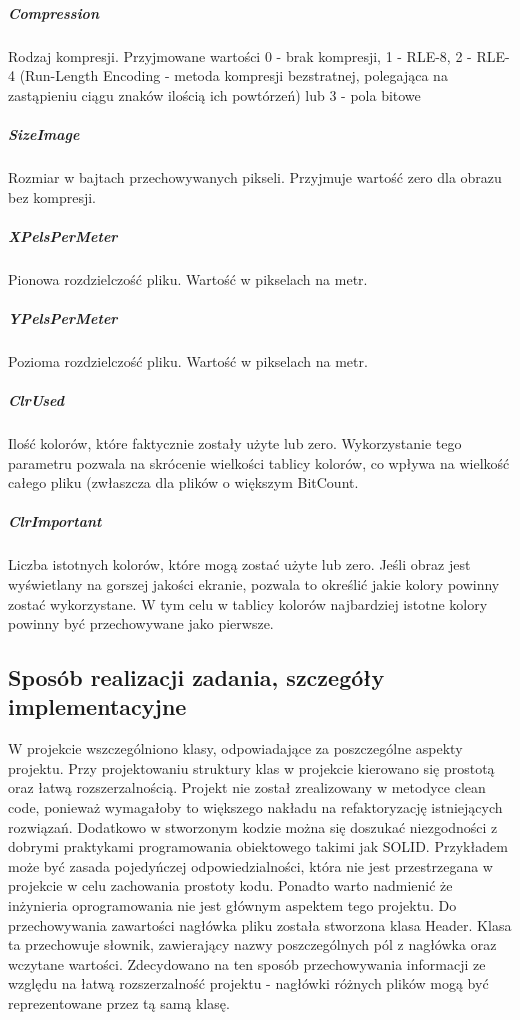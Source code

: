 \documentclass{article}
\begin{document}
\subparagraph{Compression}
Rodzaj kompresji. Przyjmowane wartości 0 - brak kompresji, 1 - RLE-8, 2 - RLE-4 (Run-Length Encoding - metoda kompresji bezstratnej, polegająca na zastąpieniu ciągu znaków ilością ich powtórzeń) lub 3 - pola bitowe

\subparagraph{SizeImage}
Rozmiar w bajtach przechowywanych pikseli. Przyjmuje wartość zero dla obrazu bez kompresji.

\subparagraph{XPelsPerMeter}
Pionowa rozdzielczość pliku. Wartość w pikselach na metr.

\subparagraph{YPelsPerMeter}
Pozioma rozdzielczość pliku. Wartość w pikselach na metr.

\subparagraph{ClrUsed}
Ilość kolorów, które faktycznie zostały użyte lub zero. Wykorzystanie tego parametru pozwala na skrócenie wielkości tablicy kolorów, co wpływa na wielkość całego pliku (zwłaszcza dla plików o większym BitCount.

\subparagraph{ClrImportant}
Liczba istotnych kolorów, które mogą zostać użyte lub zero. Jeśli obraz jest wyświetlany na gorszej jakości ekranie, pozwala to określić jakie kolory powinny zostać wykorzystane. W tym celu w tablicy kolorów najbardziej istotne kolory powinny być przechowywane jako pierwsze.



\subsection{Sposób realizacji zadania, szczegóły implementacyjne}
W projekcie wszczególniono klasy, odpowiadające za poszczególne aspekty projektu. Przy projektowaniu struktury klas w projekcie kierowano się prostotą oraz łatwą rozszerzalnością. Projekt nie został zrealizowany w metodyce clean code, ponieważ wymagałoby to większego nakładu na refaktoryzację istniejących rozwiązań. Dodatkowo w stworzonym kodzie można się doszukać niezgodności z dobrymi praktykami programowania obiektowego takimi jak SOLID. Przykładem może być zasada pojedyńczej odpowiedzialności, która nie jest przestrzegana w projekcie w celu zachowania prostoty kodu. Ponadto warto nadmienić że inżynieria oprogramowania nie jest głównym aspektem tego projektu.
Do przechowywania zawartości nagłówka pliku została stworzona klasa Header. Klasa ta przechowuje słownik, zawierający nazwy poszczególnych pól z nagłówka oraz wczytane wartości. Zdecydowano na ten sposób przechowywania informacji ze względu na łatwą rozszerzalność projektu - nagłówki różnych plików mogą być reprezentowane przez tą samą klasę.
\end{document}
